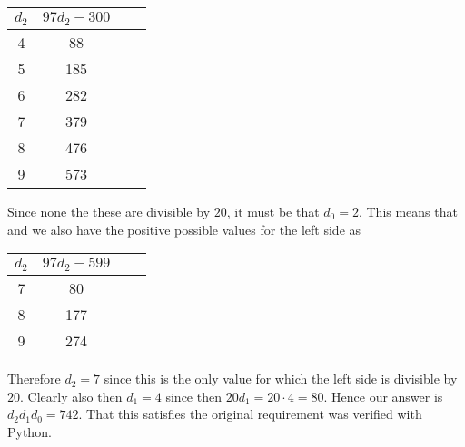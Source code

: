 \documentclass[table]{article}
\begin{document}
{\begin{center}
\begin{tabular}{c|ccc}
      $d_2$ & $97 d_2 - 300$ \\
      \hline
      4 & 88 \\
      5 & 185 \\
      6 & 282 \\
      7 & 379 \\
      8 & 476 \\
      9 & 573 \\
    \end{tabular}
  \end{center}
  Since none the these are divisible by $20$, it must be that $d_0 = 2$.
  This means that
  and we also have the positive possible values for the left side as
  \begin{center}
    \begin{tabular}{c|ccc}
      $d_2$ & $97 d_2 - 599$ \\
      \hline
      7 & 80 \\
      8 & 177 \\
      9 & 274 \\
    \end{tabular}
  \end{center}
  Therefore $d_2 = 7$ since this is the only value for which the left side is divisible by $20$.
  Clearly also then $d_1 = 4$ since then $20 d_1 = 20 \cdot 4 = 80$.
  Hence our answer is $d_2 d_1 d_0 = 742$.
  That this satisfies the original requirement was verified with Python.
}













\end{document}
